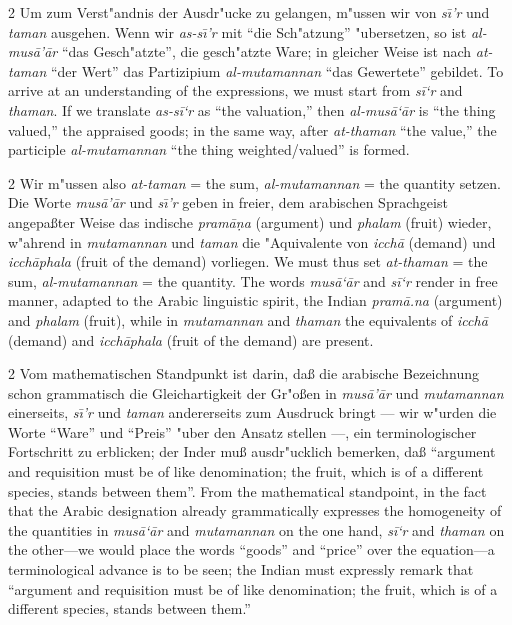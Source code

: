 \documentclass[10pt,a4paper]{article}
\renewcommand{\switchcolumn}{\syncronize\nointerlineskip\columnbreak}
\newcommand{\enquote}[1]{``#1''}
\begin{document}
\begin{paracol}{2}
Um zum Verst"andnis der Ausdr"ucke zu gelangen, m"ussen wir von \textit{s\=\i'r} und \textit{taman} ausgehen. Wenn wir \textit{as-s\=\i'r} mit \enquote{die Sch"atzung} "ubersetzen, so ist \textit{al-mus\=a'\=ar} \enquote{das Gesch"atzte}, die gesch"atzte Ware; in gleicher Weise ist nach \textit{at-taman} \enquote{der Wert} das Partizipium \textit{al-mutamannan} \enquote{das Gewertete} gebildet.
\switchcolumn
To arrive at an understanding of the expressions, we must start from \textit{s\={i}`r} and \textit{thaman}. If we translate \textit{as-s\={i}`r} as ``the valuation,'' then \textit{al-mus\=a`\=ar} is ``the thing valued,'' the appraised goods; in the same way, after \textit{at-thaman} ``the value,'' the participle \textit{al-mutamannan} ``the thing weighted/valued'' is formed.
\end{paracol}

\begin{paracol}{2}
Wir m"ussen also \textit{at-taman} = the sum, \textit{al-mutamannan} = the quantity setzen. Die Worte \textit{mus\=a'\=ar} und \textit{s\=\i'r} geben in freier, dem arabischen Sprachgeist angepa\ss{}ter Weise das indische \textit{pram\=a\d{n}a} (argument) und \textit{phalam} (fruit) wieder, w"ahrend in \textit{mutamannan} und \textit{taman} die "Aquivalente von \textit{icch\=a} (demand) und \textit{icch\=aphala} (fruit of the demand) vorliegen.
\switchcolumn
We must thus set \textit{at-thaman} = the sum, \textit{al-mutamannan} = the quantity. The words \textit{mus\=a`\=ar} and \textit{s\={i}`r} render in free manner, adapted to the Arabic linguistic spirit, the Indian \textit{pram\=a.na} (argument) and \textit{phalam} (fruit), while in \textit{mutamannan} and \textit{thaman} the equivalents of \textit{icch\=a} (demand) and \textit{icch\=aphala} (fruit of the demand) are present.
\end{paracol}

\begin{paracol}{2}
Vom mathematischen Standpunkt ist darin, da\ss{} die arabische Bezeichnung schon grammatisch die Gleichartigkeit der Gr"o\ss{}en in \textit{mus\=a'\=ar} und \textit{mutamannan} einerseits, \textit{s\=\i'r} und \textit{taman} andererseits zum Ausdruck bringt --- wir w"urden die Worte \enquote{Ware} und \enquote{Preis} "uber den Ansatz stellen ---, ein terminologischer Fortschritt zu erblicken; der Inder mu\ss{} ausdr"ucklich bemerken, da\ss{} \enquote{argument and requisition must be of like denomination; the fruit, which is of a different species, stands between them}.
\switchcolumn
From the mathematical standpoint, in the fact that the Arabic designation already grammatically expresses the homogeneity of the quantities in \textit{mus\=a`\=ar} and \textit{mutamannan} on the one hand, \textit{s\={i}`r} and \textit{thaman} on the other---we would place the words ``goods'' and ``price'' over the equation---a terminological advance is to be seen; the Indian must expressly remark that ``argument and requisition must be of like denomination; the fruit, which is of a different species, stands between them.''
\end{paracol}
\end{document}
